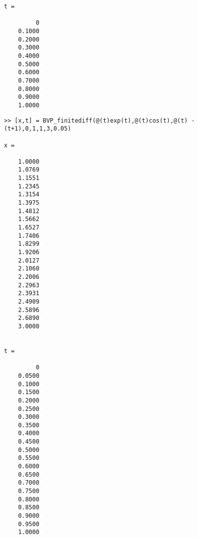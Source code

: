 \documentclass{article}
\begin{document}
\begin{preview}
\begin{verbatim}
t =

         0
    0.1000
    0.2000
    0.3000
    0.4000
    0.5000
    0.6000
    0.7000
    0.8000
    0.9000
    1.0000
\end{verbatim}
\begin{verbatim}
>> [x,t] = BVP_finitediff(@(t)exp(t),@(t)cos(t),@(t) -(t+1),0,1,1,3,0.05)

x =

    1.0000
    1.0769
    1.1551
    1.2345
    1.3154
    1.3975
    1.4812
    1.5662
    1.6527
    1.7406
    1.8299
    1.9206
    2.0127
    2.1060
    2.2006
    2.2963
    2.3931
    2.4909
    2.5896
    2.6890
    3.0000


t =

         0
    0.0500
    0.1000
    0.1500
    0.2000
    0.2500
    0.3000
    0.3500
    0.4000
    0.4500
    0.5000
    0.5500
    0.6000
    0.6500
    0.7000
    0.7500
    0.8000
    0.8500
    0.9000
    0.9500
    1.0000
\end{verbatim}
\end{preview}
\end{document}
